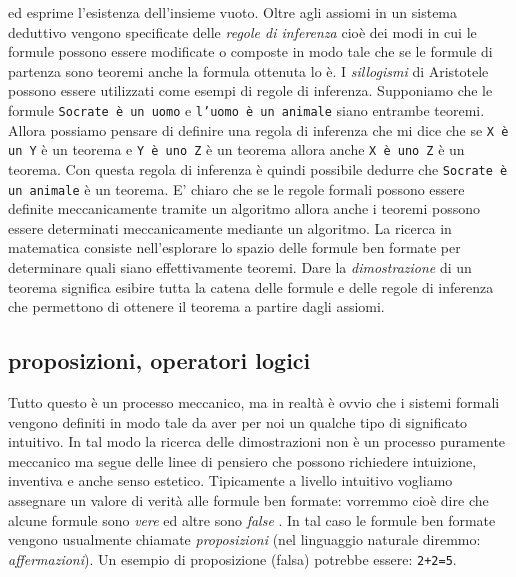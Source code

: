 ed esprime l'esistenza dell'insieme vuoto.
Oltre agli assiomi in un sistema deduttivo vengono specificate delle 
\emph{regole di inferenza} cioè dei modi in cui 
le formule possono essere modificate o composte in modo tale che se le formule 
di partenza sono teoremi anche la formula ottenuta lo è.
I \emph{sillogismi} di Aristotele possono essere utilizzati come esempi di regole 
di inferenza. 
Supponiamo che le formule 
\texttt{Socrate è un uomo} 
e \texttt{l'uomo è un animale}
siano entrambe teoremi. Allora possiamo pensare di definire una regola di inferenza 
che mi dice che se \texttt{X è un Y} è un teorema 
e \texttt{Y è uno Z}
è un teorema allora anche \texttt{X è uno Z} è un teorema. 
Con questa regola di inferenza è quindi possibile dedurre che 
\texttt{Socrate è un animale}
è un teorema.
E' chiaro che se le regole formali possono essere definite meccanicamente 
tramite un algoritmo allora anche i teoremi possono essere determinati meccanicamente 
mediante un algoritmo.
La ricerca in matematica consiste nell'esplorare lo spazio delle formule ben formate 
per determinare quali siano effettivamente teoremi. 
Dare la \emph{dimostrazione}%
%
 di un teorema significa esibire tutta la catena delle formule 
e delle regole di inferenza che permettono di ottenere il teorema a partire dagli 
assiomi.

\subsection{proposizioni, operatori logici}

Tutto questo è un processo meccanico, ma in realtà è ovvio che i sistemi formali 
vengono definiti in modo tale da aver per noi un qualche tipo di significato intuitivo.
In tal modo la ricerca delle dimostrazioni non è un processo puramente meccanico 
ma segue delle linee di pensiero che possono richiedere intuizione, inventiva e anche 
senso estetico. 
Tipicamente a livello intuitivo vogliamo assegnare un valore di verità alle formule 
ben formate: vorremmo cioè dire che alcune formule sono 
\emph{vere}%
%
ed altre sono 
\emph{false}%
%
. 
In tal caso le formule ben formate vengono usualmente chiamate \emph{proposizioni}%
%
(nel linguaggio naturale diremmo: \emph{affermazioni}).
Un esempio di proposizione (falsa) potrebbe essere: 
\texttt{2+2=5}.


